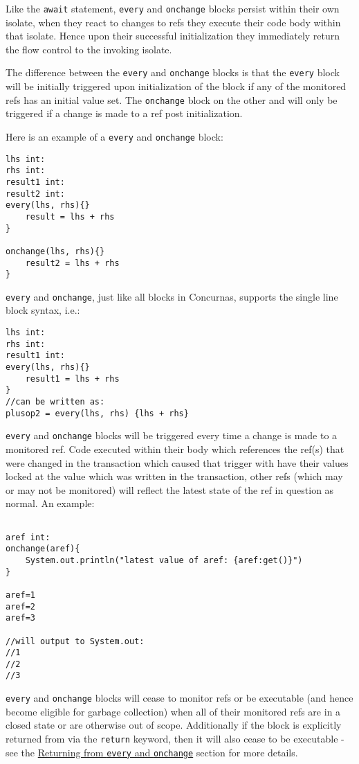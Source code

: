 \documentclass[conc-doc]{subfiles}
\begin{document}
Like the \lstinline{await} statement, \lstinline{every} and \lstinline{onchange} blocks persist within their own isolate, when they react to changes to refs they execute their code body within that isolate. Hence upon their successful initialization they immediately return the flow control to the invoking isolate.

The difference between the \lstinline{every} and \lstinline{onchange} blocks is that the \lstinline{every} block will be initially triggered upon initialization of the block if any of the monitored refs has an initial value set. The \lstinline{onchange} block on the other and will only be triggered if a change is made to a ref post initialization.

Here is an example of a \lstinline{every} and \lstinline{onchange} block:

\begin{lstlisting}
lhs int:
rhs int:
result1 int:
result2 int:
every(lhs, rhs){}
	result = lhs + rhs
}

onchange(lhs, rhs){}
	result2 = lhs + rhs
}
\end{lstlisting}

\lstinline{every} and \lstinline{onchange}, just like all blocks in Concurnas, supports the single line block syntax, i.e.:
\begin{lstlisting}
lhs int:
rhs int:
result1 int:
every(lhs, rhs){}
	result1 = lhs + rhs
}
//can be written as:
plusop2 = every(lhs, rhs) {lhs + rhs}
\end{lstlisting}	

\lstinline{every} and \lstinline{onchange} blocks will be triggered every time a change is made to a monitored ref. Code executed within their body which references the ref(s) that were changed in the transaction which caused that trigger with have their values locked at the value which was written in the transaction, other refs (which may or may not be monitored) will reflect the latest state of the ref in question as normal. An example:

\begin{lstlisting}

aref int:
onchange(aref){
	System.out.println("latest value of aref: {aref:get()}")
}

aref=1
aref=2
aref=3

//will output to System.out:
//1
//2
//3
\end{lstlisting}	


\lstinline{every} and \lstinline{onchange} blocks will cease to monitor refs or be executable (and hence become eligible for garbage collection) when all of their monitored refs are in a closed state or are otherwise out of scope. Additionally if the block is explicitly returned from via the \lstinline{return} keyword, then it will also cease to be executable - see the \hyperref[subsubsec:returnEveryonechange]{Returning from \lstinline!every! and \lstinline!onchange!} section for more details.
\end{document}
